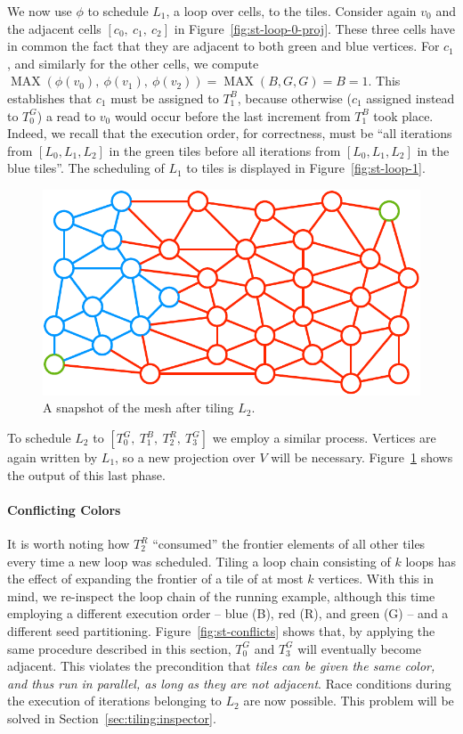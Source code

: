 We now use $\phi$ to schedule $L_1$, a loop over cells, to the tiles. Consider again $v_0$ and the adjacent cells $[c_0,\ c_1,\ c_2]$ in Figure~\ref{fig:st-loop-0-proj}. These three cells have in common the fact that they are adjacent to both green and blue vertices. For $c_1$, and similarly for the other cells, we compute $\operatorname{MAX}(\phi(v_0),\ \phi(v_1),\ \phi(v_2)) = \operatorname{MAX}(B, G, G) = B = 1$. This establishes that $c_1$ must be assigned to $T_1^B$, because otherwise ($c_1$ assigned instead to $T_0^G$) a read to $v_0$ would occur before the last increment from $T_1^B$ took place. Indeed, we recall that the execution order, for correctness, must be ``all iterations from $[L_0, L_1, L_2]$ in the green tiles before all iterations from $[L_0, L_1, L_2]$ in the blue tiles''. The scheduling of $L_1$ to tiles is displayed in Figure~\ref{fig:st-loop-1}.

\begin{figure}[h]
\centering
\includegraphics[scale=0.6]{sparsetiling/figures/loop_2.pdf}
\caption{A snapshot of the mesh after tiling $L_2$.}
\label{fig:st-loop-2}
\end{figure}

To schedule $L_2$ to $[T_0^G,\ T_1^B,\ T_2^R,\ T_3^G]$ we employ a similar process. Vertices are again written by $L_1$, so a new projection over $V$ will be necessary. Figure~\ref{fig:st-loop-2} shows the output of this last phase. 



\paragraph{Conflicting Colors}
It is worth noting how $T_2^R$ ``consumed'' the frontier elements of all other tiles every time a new loop was scheduled. Tiling a loop chain consisting of $k$ loops has the effect of expanding the frontier of a tile of at most $k$ vertices. With this in mind, we re-inspect the loop chain of the running example, although this time employing a different execution order -- blue (B), red (R), and green (G) -- and a different seed partitioning. Figure~\ref{fig:st-conflicts} shows that, by applying the same procedure described in this section, $T_0^G$ and $T_3^G$ will eventually become adjacent. This violates the precondition that {\it tiles can be given the same color, and thus run in parallel, as long as they are not adjacent}. Race conditions during the execution of iterations belonging to $L_2$ are now possible. This problem will be solved in Section~\ref{sec:tiling:inspector}.

